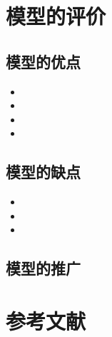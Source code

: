 \documentclass[withoutpreface,bwprint]{cumcmthesis}
\begin{document}
	\section{模型的评价}
	\subsection{模型的优点}
	\begin{itemize}
		\item 
		\item 
		\item 
		\item 
	\end{itemize}
	\subsection{模型的缺点}
	\begin{itemize}
		\item 
		\item 
		\item 
	\end{itemize}
	\subsection{模型的推广}
	

	
	\section{参考文献}
	
	
	
\end{document}
